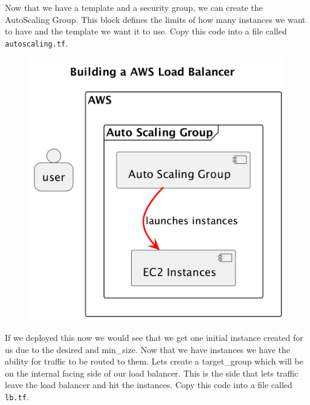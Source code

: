 \documentclass{csse4400}
\begin{document}
Now that we have a template and a security group, we can create the AutoScaling Group. This block defines the limits of how many instances we want to have and the template we want it to use. Copy this code into a file called \texttt{autoscaling.tf}.

\begin{figure}[H]
  \begin{center}
    \includegraphics[scale=0.2]{diagrams/lb1}
  \end{center}
\end{figure}


If we deployed this now we would see that we get one initial instance created for us due to the desired and min\_size. Now that we have instances we have the ability for traffic to be routed to them. Lets create a target\_group which will be on the internal facing side of our load balancer. This is the side that lets traffic leave the load balancer and hit the instances. Copy this code into a file called \texttt{lb.tf}.
\end{document}
